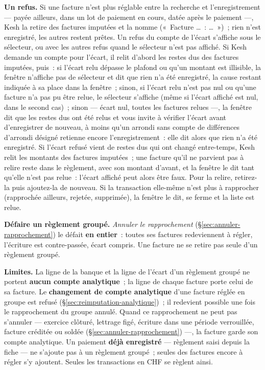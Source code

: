 \documentclass[a4paper,11pt,oneside]{article}
\begin{document}
\textbf{Un refus.} Si une facture n'est plus réglable entre la recherche et l'enregistrement --- payée ailleurs, dans un lot de paiement en cours, datée après le paiement ---, Kesh la retire des factures imputées et la nomme («~Facture \ldots~: \ldots~»)~; rien n'est enregistré, les autres restent prêtes. Un refus du compte de l'écart s'affiche sous le sélecteur, ou avec les autres refus quand le sélecteur n'est pas affiché. Si Kesh demande un compte pour l'écart, il relit d'abord les restes dus des factures imputées, puis~: si l'écart relu dépasse le plafond ou qu'un montant est illisible, la fenêtre n'affiche pas de sélecteur et dit que rien n'a été enregistré, la cause restant indiquée à sa place dans la fenêtre~; sinon, si l'écart relu n'est pas nul ou qu'une facture n'a pas pu être relue, le sélecteur s'affiche (même si l'écart affiché est nul, dans le second cas)~; sinon --- écart nul, toutes les factures relues ---, la fenêtre dit que les restes dus ont été relus et vous invite à vérifier l'écart avant d'enregistrer de nouveau, à moins qu'un arrondi sans compte de différences d'arrondi désigné retienne encore l'enregistrement~: elle dit alors que rien n'a été enregistré. Si l'écart refusé vient de restes dus qui ont changé entre-temps, Kesh relit les montants des factures imputées~; une facture qu'il ne parvient pas à relire reste dans le règlement, avec son montant d'avant, et la fenêtre le dit tant qu'elle n'est pas relue~: l'écart affiché peut alors être faux. Pour la relire, retirez-la puis ajoutez-la de nouveau. Si la transaction elle-même n'est plus à rapprocher (rapprochée ailleurs, rejetée, supprimée), la fenêtre le dit, se ferme et la liste est relue.

\textbf{Défaire un règlement groupé.} \emph{Annuler le rapprochement} (\S\ref{sec:annuler-rapprochement}) le défait \textbf{en entier}~: toutes ses factures redeviennent à régler, l'écriture est contre-passée, écart compris. Une facture ne se retire pas seule d'un règlement groupé.

\textbf{Limites.} La ligne de la banque et la ligne de l'écart d'un règlement groupé ne portent \textbf{aucun compte analytique}~; la ligne de chaque facture porte celui de sa facture. Le \textbf{changement de compte analytique} d'une facture réglée en groupe est refusé (\S\ref{sec:reimputation-analytique})~; il redevient possible une fois le rapprochement du groupe annulé. Quand ce rapprochement ne peut pas s'annuler --- exercice clôturé, lettrage figé, écriture dans une période verrouillée, facture créditée ou soldée (\S\ref{sec:annuler-rapprochement}) ---, la facture garde son compte analytique. Un paiement \textbf{déjà enregistré} --- règlement saisi depuis la fiche --- ne s'ajoute pas à un règlement groupé~; seules des factures encore à régler s'y ajoutent. Seules les transactions en CHF se règlent ainsi.
\end{document}
